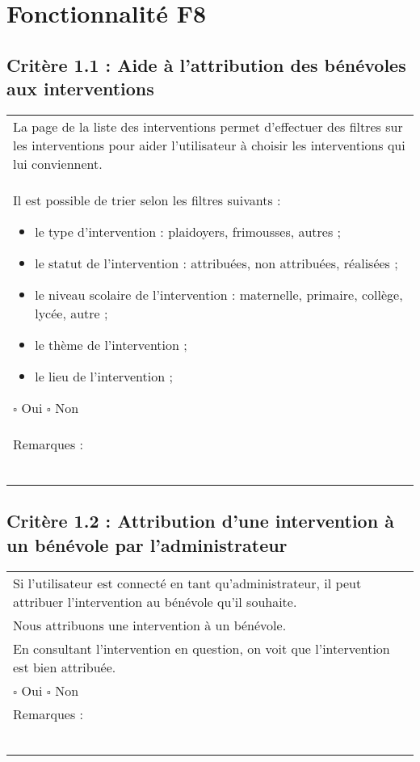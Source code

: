 
\section{Fonctionnalité F8}

	\subsection*{Critère 1.1 : Aide à l’attribution des bénévoles aux interventions}
	
		\begin{center}
    	 		\begin{tabular}[h]{|p{}|}
			\hline
				La page de la liste des interventions permet d’effectuer des filtres sur les interventions pour aider l’utilisateur à choisir les interventions qui lui conviennent.\\
Il est possible de trier selon les filtres suivants :
		\begin{itemize}
			\item le type d’intervention : plaidoyers, frimousses, autres ;
			\item le statut de l’intervention : attribuées, non attribuées, réalisées ;
			\item le niveau scolaire de l’intervention : maternelle, primaire, collège, lycée, autre ;
			\item le thème de l’intervention ;
			\item le lieu de l’intervention ;
		\end{itemize}
				
				$\square$ Oui \hfill \hfill $\square$ Non \\\hline Remarques : \\ ~\\
			 \\\hline
     		\end{tabular}
  		\end{center}	

	\subsection*{Critère 1.2 : Attribution d’une intervention à un bénévole par l’administrateur}
	
		\begin{center}
    	 		\begin{tabular}[h]{|p{}|}
			\hline
				Si l’utilisateur est connecté en tant qu’administrateur, il peut attribuer l’intervention au
bénévole qu’il souhaite.\\
Nous attribuons une intervention à un bénévole.\\
En consultant l’intervention en question, on voit que l’intervention est bien attribuée.\\
				
				$\square$ Oui \hfill \hfill $\square$ Non \\\hline Remarques : \\ ~\\
			 \\\hline
     		\end{tabular}
  		\end{center}	

